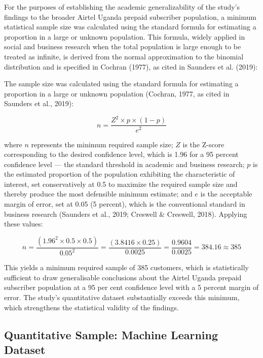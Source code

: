 For the purposes of establishing the academic generalizability of the study's findings to the broader Airtel Uganda prepaid subscriber population, a minimum statistical sample size was calculated using the standard formula for estimating a proportion in a large or unknown population. This formula, widely applied in social and business research when the total population is large enough to be treated as infinite, is derived from the normal approximation to the binomial distribution and is specified in Cochran (1977), as cited in Saunders et al. (2019):

The sample size was calculated using the standard formula for estimating a proportion in a large or unknown population (Cochran, 1977, as cited in Saunders et al., 2019):

\begin{equation}
n = \frac{Z^2 \times p \times (1 - p)}{e^2}
\end{equation}

where $n$ represents the minimum required sample size; $Z$ is the Z-score corresponding to the desired confidence level, which is 1.96 for a 95 percent confidence level --- the standard threshold in academic and business research; $p$ is the estimated proportion of the population exhibiting the characteristic of interest, set conservatively at 0.5 to maximize the required sample size and thereby produce the most defensible minimum estimate; and $e$ is the acceptable margin of error, set at 0.05 (5 percent), which is the conventional standard in business research (Saunders et al., 2019; Creswell \& Creswell, 2018). Applying these values:

\begin{equation}
n = \frac{(1.96^2 \times 0.5 \times 0.5)}{0.05^2} = \frac{(3.8416 \times 0.25)}{0.0025} = \frac{0.9604}{0.0025} = 384.16 \approx 385
\end{equation}

This yields a minimum required sample of 385 customers, which is statistically sufficient to draw generalisable conclusions about the Airtel Uganda prepaid subscriber population at a 95 per cent confidence level with a 5 percent margin of error. The study's quantitative dataset substantially exceeds this minimum, which strengthens the statistical validity of the findings.

\subsection{Quantitative Sample: Machine Learning Dataset}

